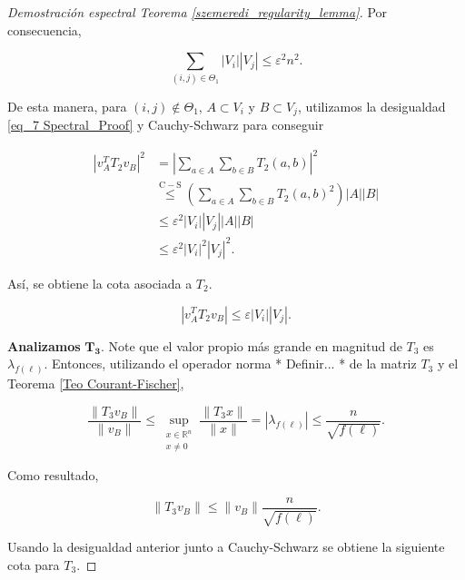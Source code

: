 \documentclass{article}[14pts]
\newcommand{\fs}[1]{{\color{blue}* #1 *}}
\providecommand{\norm}[1]{\lVert#1\rVert}
\providecommand{\norm}[1]{\lVert#1\rVert}
\let\varepsilon=\varepsilon
\begin{document}
\begin{proof}[Demostración espectral Teorema \ref{szemeredi_regularity_lemma}]
    Por consecuencia,\medskip

    \begin{equation} \label{eq_8 Spectral_Proof}
        \sum_{(i,j)\in \Theta_1} |V_i| |V_j| \leq \varepsilon^{2} n^{2}.
    \end{equation}\medskip

    De esta manera, para $(i,j)\not\in \Theta_1$, $A\subset V_i$ y $B\subset V_j$, utilizamos la desigualdad \eqref{eq_7 Spectral_Proof} y Cauchy-Schwarz para conseguir\medskip

    \begin{align*}
    \left| v_{A}^{T} T_2 v_B\right|^{2} &= \left| \sum_{a\in A}\sum_{b\in B} T_{2}(a,b)\right|^{2}\\
    &\overset{\mathrm{C-S}}{\leq} \left( \sum_{a\in A}\sum_{b\in B} T_{2}(a,b)^{2}\right)|A||B|\\
    &\leq \varepsilon^{2} |V_i| |V_j| |A| |B|\\
    &\leq \varepsilon^{2} |V_i|^{2} |V_j|^{2}.
    \end{align*}\medskip

    Así, se obtiene la cota asociada a $T_2$.\medskip

    \begin{equation} \label{eq_9 Spectral_Proof}
        |v_{A}^{T} T_2 v_B| \leq \varepsilon |V_i| |V_j|.
    \end{equation}\medskip

    \textbf{Analizamos} $\mathbf{T_3}$. Note que el valor propio más grande en magnitud de $T_3$ es $\lambda_{f(\ell)}$. Entonces, utilizando el operador norma \fs{Definir...} de la matriz $T_3$ y el Teorema \ref{Teo Courant-Fischer},\medskip

    \begin{equation*}
        \frac{\norm{T_3 v_B}}{\norm{v_B}} \leq \sup_{\substack{x\in \mathbb{R}^{n} \\ x\not= 0}} \frac{\norm{T_3 x}}{\norm{x}} = \left|\lambda_{f(\ell)}\right| \leq \frac{n}{\sqrt{f(\ell)}}.
    \end{equation*}\medskip

    Como resultado,\medskip

    \begin{equation*}
        \norm{T_3 v_B} \leq \norm{v_B}\frac{n}{\sqrt{f(\ell)}}.
    \end{equation*}\medskip

    Usando la desigualdad anterior junto a Cauchy-Schwarz se obtiene la siguiente cota para $T_3$.\medskip


\end{proof}
\end{document}
